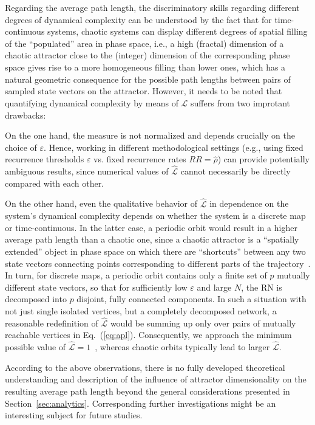 \documentclass[graybox]{svmult}
\begin{document}
Regarding the average path length, the discriminatory skills regarding different degrees of dynamical complexity can be understood by the fact that for time-continuous systems, chaotic systems can display different degrees of spatial filling of the ``populated'' area in phase space, i.e., a high (fractal) dimension of a chaotic attractor close to the (integer) dimension of the corresponding phase space gives rise to a more homogeneous filling than lower ones, which has a natural geometric consequence for the possible path lengths between pairs of sampled state vectors on the attractor. However, it needs to be noted that quantifying dynamical complexity by means of $\hat{\mathcal{L}}$ suffers from two improtant drawbacks: 

On the one hand, the measure is not normalized and depends crucially on the choice of $\varepsilon$. Hence, working in different methodological settings (e.g., using fixed recurrence thresholds $\varepsilon$ vs. fixed recurrence rates $RR=\hat{\rho}$) can provide potentially ambiguous results, since numerical values of $\hat{\mathcal{L}}$ cannot necessarily be directly compared with each other. 

On the other hand, even the qualitative behavior of $\hat{\mathcal{L}}$ in dependence on the system's dynamical complexity depends on whether the system is a discrete map or time-continuous. In the latter case, a periodic orbit would result in a higher average path length than a chaotic one, since a chaotic attractor is a ``spatially extended'' object in phase space on which there are ``shortcuts'' between any two state vectors connecting points corresponding to different parts of the trajectory~\cite{Donner2010NJP}. In turn, for discrete maps, a periodic orbit contains only a finite set of $p$ mutually different state vectors, so that for sufficiently low $\varepsilon$ and large $N$, the RN is decomposed into $p$ disjoint, fully connected components. In such a situation with not just single isolated vertices, but a completely decomposed network, a reasonable redefinition of $\hat{\mathcal{L}}$ would be summing up only over pairs of mutually reachable vertices in Eq.~(\ref{eq:apl}). Consequently, we approach the minimum possible value of $\hat{\mathcal{L}}=1$~\cite{Marwan2009}, whereas chaotic orbits typically lead to larger $\hat{\mathcal{L}}$.

According to the above observations, there is no fully developed theoretical understanding and description of the influence of attractor dimensionality on the resulting average path length beyond the general considerations presented in Section~\ref{sec:analytics}. Corresponding further investigations might be an interesting subject for future studies.
\end{document}
